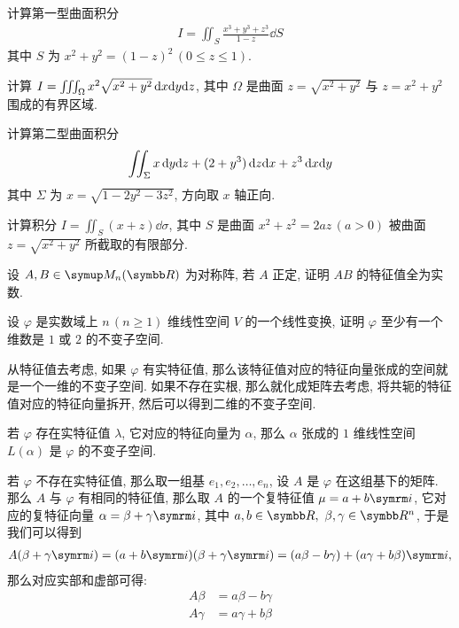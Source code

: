 \begin{exercise}[resume=exer]
      \item 计算第一型曲面积分
      \begin{align*}
          I = \iint_{S} \frac{x^{3} + y^{3} + z^{3}}{1-z} \dd{S}
      \end{align*}
      其中 $ S $ 为 $ x^{2} + y^{2} = (1-z)^{2}\,(0 \le z \le 1) $.
      \item 计算 $ I = \iiint_{\Omega} x^{2}\sqrt{x^{2} + y^{2}}\,\dx\dd y\dd z $, 其中 $ \Omega $ 是曲面 $ z = \sqrt{x^{2} + y^{2}} $ 与 $ z = x^{2} + y^{2} $ 围成的有界区域.
      \item 计算第二型曲面积分
      \begin{align*}
          \iint_{\Sigma} x\,\dd y\dd z + (2 + y^{3})\,\dd z\dx + z^{3}\,\dx\dd y
      \end{align*}
      其中 $ \Sigma $ 为 $ x = \sqrt{1 - 2y^{2} - 3z^{2}} $, 方向取 $ x $ 轴正向.
      \item 计算积分 $ I = \iint_{S} (x + z) \dd{\sigma} $, 其中 $ S $ 是曲面 $ x^{2} + z^{2} = 2az\,(a > 0) $ 被曲面 $ z = \sqrt{x^{2} + y^{2}} $ 所截取的有限部分.
      \item 设 $ A, B \in \MM $ 为对称阵, 若 $ A $ 正定, 证明 $ AB $ 的特征值全为实数.
      \item 设 $ \varphi $ 是实数域上 $ n\,(n\ge 1) $ 维线性空间 $ V $ 的一个线性变换, 证明 $ \varphi $ 至少有一个维数是 $ 1 $ 或 $ 2 $ 的不变子空间.
      \begin{hint}
          从特征值去考虑, 如果 $ \varphi $ 有实特征值, 那么该特征值对应的特征向量张成的空间就是一个一维的不变子空间. 如果不存在实根, 那么就化成矩阵去考虑, 将共轭的特征值对应的特征向量拆开, 然后可以得到二维的不变子空间.
      \end{hint}
      \begin{answer}
          若 $ \varphi $ 存在实特征值 $ \lambda $, 它对应的特征向量为 $ \alpha $, 那么 $ \alpha $ 张成的 $ 1 $ 维线性空间 $ L(\alpha) $ 是 $ \varphi $ 的不变子空间.

          若 $ \varphi $ 不存在实特征值, 那么取一组基 $ e_{1}, e_{2}, \dots, e_{n} $, 设 $ A $ 是 $ \varphi $ 在这组基下的矩阵. 那么 $ A $ 与 $ \varphi $ 有相同的特征值, 那么取 $ A $ 的一个复特征值 $ \mu = a + b\mi $, 它对应的复特征向量 $ \alpha = \beta + \gamma\mi $, 其中 $ a, b \in \R,\ \beta, \gamma \in \R^{n} $, 于是我们可以得到
          \begin{align*}
              A(\beta + \gamma\mi) = (a + b\mi)(\beta + \gamma\mi) = (a\beta - b\gamma) + (a\gamma + b\beta)\mi,
          \end{align*}
          那么对应实部和虚部可得:
          \begin{align*}
              A\beta & = a\beta - b\gamma\\
              A\gamma & = a\gamma + b\beta
          \end{align*}


\end{answer}
\end{exercise}
